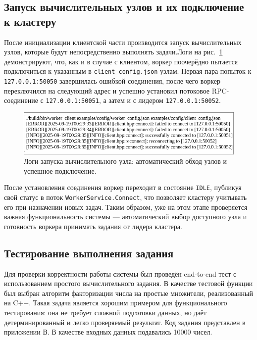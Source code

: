 \subsection{Запуск вычислительных узлов и их подключение к кластеру}

После инициализации клиентской части производится запуск вычислительных узлов,
которые будут непосредственно выполнять задачи.Логи на
рис.~\ref{fig:worker_start} демонстрируют, что, как и в случае с клиентом,
воркер поочерёдно пытается подключиться к указанным в
\texttt{client\_config.json} узлам. Первая пара попыток к
\texttt{127.0.0.1:50050} завершилась ошибкой соединения, после чего воркер
переключился на следующий адрес и успешно установил потоковое RPC-соединение с
\texttt{127.0.0.1:50051}, а затем и с лидером \texttt{127.0.0.1:50052}.

\begin{figure}[h!]
    \centering
    \includegraphics[width=0.8\linewidth]{inc/worker-log.png}
    \caption{Логи запуска вычислительного узла: автоматический обход узлов и успешное подключение.}
    \label{fig:worker_start}
\end{figure}

После установления соединения воркер переходит в состояние \texttt{IDLE},
публикуя свой статус в поток \texttt{WorkerService.Connect}, что позволяет
кластеру учитывать его при назначении новых задач. Таким образом, уже на этом
этапе проверяется важная функциональность системы — автоматический выбор
доступного узла и готовность воркера принимать задания от лидера кластера.

\subsection{Тестирование выполнения задания}

Для проверки корректности работы системы был проведён end-to-end тест с
использованием простого вычислительного задания. В качестве тестовой функции
был выбран алгоритм факторизации числа на простые множители, реализованный на
C++. Такая задача является хорошим примером для функционального тестирования:
она не требует сложной подготовки данных, но даёт детерминированный и легко
проверяемый результат. Код задания представлен в приложении В. В качестве
входных данных подавались 10000 чисел.

